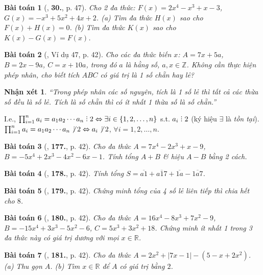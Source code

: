 \documentclass{article}
\numberwithin{equation}{section}
\newtheorem{baitoan}{Bài toán}
\newtheorem{nhanxet}{Nhận xét}[section]
\DeclareRobustCommand{\divby}{%
	\mathrel{\vbox{\baselineskip.65ex\lineskiplimit0pt\hbox{.}\hbox{.}\hbox{.}}}%
}
\begin{document}
\begin{baitoan}[\cite{SBT_Toan_7_Canh_Dieu_tap_2}, \textbf{30.}, p. 47]
	Cho 2 đa thức: $F(x) = 2x^4 - x^3 + x - 3$, $G(x) = -x^3 + 5x^2 + 4x + 2$. (a) Tìm đa thức $H(x)$ sao cho $F(x) + H(x) = 0$. (b) Tìm đa thức $K(x)$ sao cho $K(x) - G(x) = F(x)$.
\end{baitoan}

\begin{baitoan}[\cite{Tuyen_Toan_7}, Ví dụ 47, p. 42]
	Cho các đa thức biến $x$: $A = 7x + 5a$, $B = 2x - 9a$, $C = x + 10a$, trong đó $a$ là hằng số, $a,x\in\mathbb{Z}$. Không cần thực hiện phép nhân, cho biết tích $ABC$ có giá trị là 1 số chẵn hay lẻ?
\end{baitoan}

\begin{nhanxet}
	``Trong phép nhân các số nguyên, tích là 1 số lẻ thì tất cả các thừa số đều là số lẻ. Tích là số chẵn thì có ít nhất 1 thừa số là số chẵn.''
\end{nhanxet}
I.e., $\prod_{i=1}^n a_i = a_1a_2\cdots a_n\divby2\Leftrightarrow\exists i\in\{1,2,\ldots,n\}$ s.t. $a_i\divby2$ (ký hiệu $\exists$ là \textit{tồn tại}). $\prod_{i=1}^n a_i = a_1a_2\cdots a_n\not\,\divby2\Leftrightarrow a_i\not\,\divby2$, $\forall i = 1,2,\ldots,n$.

\begin{baitoan}[\cite{Tuyen_Toan_7}, \textbf{177.}, p. 42]
	Cho đa thức $A = 7x^4 - 2x^3 + x - 9$, $B = -5x^4 + 2x^3 - 4x^2 - 6x - 1$. Tính tổng $A + B$ \& hiệu $A - B$ bằng 2 cách.
\end{baitoan}

\begin{baitoan}[\cite{Tuyen_Toan_7}, \textbf{178.}, p. 42]
	Tính tổng $S = \overline{a1} + \overline{a17} + \overline{1a} - \overline{1a7}$.
\end{baitoan}

\begin{baitoan}[\cite{Tuyen_Toan_7}, \textbf{179.}, p. 42]
	Chứng minh tổng của 4 số lẻ liên tiếp thì chia hết cho $8$.
\end{baitoan}

\begin{baitoan}[\cite{Tuyen_Toan_7}, \textbf{180.}, p. 42]
	Cho đa thức $A = 16x^4 - 8x^3 + 7x^2 - 9$, $B = -15x^4 + 3x^3 - 5x^2 - 6$, $C = 5x^3 + 3x^2 + 18$. Chứng minh ít nhất 1 trong 3 đa thức này có giá trị dương với mọi $x\in\mathbb{R}$.
\end{baitoan}

\begin{baitoan}[\cite{Tuyen_Toan_7}, \textbf{181.}, p. 42]
	Cho đa thức $A = 2x^2 + |7x - 1| - (5 - x + 2x^2)$. (a) Thu gọn $A$. (b) Tìm $x\in\mathbb{R}$ để $A$ có giá trị bằng $2$.
\end{baitoan}
\end{document}
